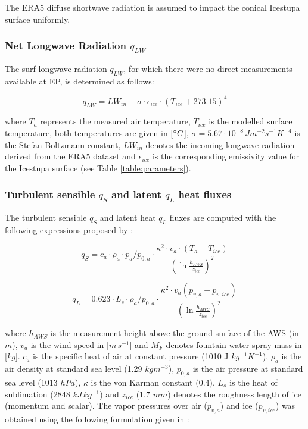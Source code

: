 \documentclass[utf8]{frontiersSCNS} %
\begin{document}
The ERA5 diffuse shortwave radiation is assumed to impact the conical Icestupa surface uniformly. 

\subsubsection{Net Longwave Radiation \texorpdfstring{$q_{LW}$}{Lg}}

The surf longwave radiation $q_{LW}$, for which there were no direct measurements available at EP, is
determined as follows:

\begin{equation} q_{LW}= LW_{in}-\sigma \cdot \epsilon_{ice} \cdot {(T_{ice}+ 273.15)}^4
\label{eqn:LW} \end{equation}

where $T_a$ represents the measured air temperature, $T_{ice}$ is the modelled surface temperature, both temperatures
are given in [$\degree C$], $\sigma=5.67\cdot 10^{-8}\,Jm^{-2}s^{-1}K^{-4}$ is the Stefan-Boltzmann constant, $LW_{in}$
denotes the incoming longwave radiation derived from the ERA5 dataset and $\epsilon_{ice}$ is the corresponding
emissivity value for the Icestupa surface (see Table \ref{table:parameters}).

\subsubsection{Turbulent sensible \texorpdfstring{$q_{S}$}{Lg} and latent \texorpdfstring{$q_{L}$}{Lg} heat fluxes }

The turbulent sensible $q_{S}$ and latent heat $q_{L}$ fluxes are computed with the following expressions proposed by
\cite{Garratt_1992}:

\begin{equation} q_{S}=c_{a} \cdot \rho_{a} \cdot p_{a}/p_{0,a} \cdot \frac{\kappa^2 \cdot v_a \cdot
(T_a-T_{ice})}{{(\ln{\frac{h_{AWS}}{z_{ice}}})}^2} \label{eqn:qs} \end{equation}

\begin{equation} q_{L}=0.623 \cdot L_s \cdot \rho_{a}/p_{0,a} \cdot \frac{\kappa^2 \cdot
v_a(p_{v,a}-p_{v,ice})}{{(\ln{\frac{h_{AWS}}{z_{ice}}})}^2} \end{equation}

where $h_{AWS}$ is the measurement height above the ground surface of the AWS (in $m$), $v_a$ is the wind speed in
[$m\,s^{-1}$] and $M_{F}$ denotes fountain water spray mass in [$kg$]. $c_a$ is the specific heat of air at constant
pressure (1010 J $kg^{-1} K^{-1}$), $\rho_{a}$ is the air density at standard sea level (1.29 $kg m^{-3}$), $p_{0,a}$ is
the air pressure at standard sea level (1013 $hPa$), $\kappa$ is the von Karman constant (0.4), $L_s$ is the heat of
sublimation (2848 $kJ\, kg^{-1}$) and $z_{ice}$ (1.7 $mm$) denotes the roughness length of ice (momentum and scalar).
The vapor pressures over air ($p_{v,a}$) and ice ($p_{v,ice}$) was obtained using the following formulation given in
\cite{WMO_2018}:
\end{document}
